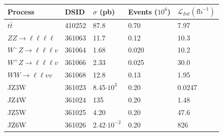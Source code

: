 \begin{table}[!htb]
  \centering
  \begin{tabular}{ l l l l l}
    \hline
    \hline
    Process         &   DSID     &   $\sigma$ (pb)       & Events ($10^{6}$) &   $\mathcal{L}_{Int} (\mathrm{fb^{-1}})$ \\
    \hline
    $t\bar{t}$                              &   410252  &   87.8   &   0.70        &   7.97                 \\
    $ZZ\rightarrow \ell \ell \ell \ell$     &   361063  &   11.7   &   0.12        &   10.3                 \\
    $W^{-}Z\rightarrow \ell \ell \ell v$    &   361064  &   1.68   &   0.020       &   10.2                 \\
    $W^{+}Z\rightarrow \ell \ell \ell v$    &   361066  &   2.33   &   0.025       &   30.0                 \\
    $WW \rightarrow \ell \ell vv$           &   361068  &   12.8   &   0.13        &   1.95                 \\
    JZ3W                                    &   361023  &   8.45$\cdot10^{3}$      &   0.20  &   0.0247     \\
    JZ4W                                    &   361024  &   135    &   0.20        &   1.48                 \\
    JZ5W                                    &   361025  &   4.20   &   0.20        &   47.6                 \\
    JZ6W                                    &   361026  &   2.42$\cdot10^{-2}$     &   0.20  &   826        \\

\end{tabular}
\end{table}
